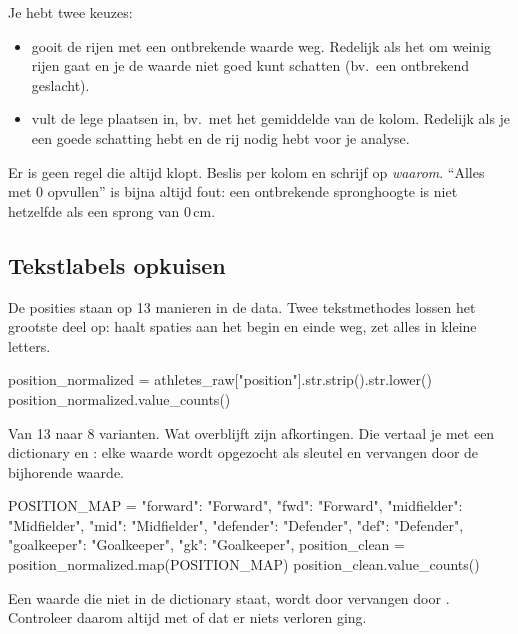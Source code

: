 \documentclass[11pt,a4paper]{article}
\begin{document}
Je hebt twee keuzes:

\begin{itemize}
  \item {} gooit de rijen met een ontbrekende waarde weg.
        Redelijk als het om weinig rijen gaat en je de waarde niet goed
        kunt schatten (bv.\ een ontbrekend geslacht).
  \item {} vult de lege plaatsen in, bv.\ met het
        gemiddelde van de kolom. Redelijk als je een goede schatting hebt
        en de rij nodig hebt voor je analyse.
\end{itemize}

\begin{kernidee}
Er is geen regel die altijd klopt. Beslis per kolom en schrijf op
\emph{waarom}. ``Alles met 0 opvullen'' is bijna altijd fout: een
ontbrekende spronghoogte is niet hetzelfde als een sprong van 0\,cm.
\end{kernidee}

\subsection{Tekstlabels opkuisen}

De posities staan op 13 manieren in de data. Twee tekstmethodes lossen
het grootste deel op:  haalt spaties aan het begin en
einde weg,  zet alles in kleine letters.

\begin{python}
position_normalized = athletes_raw["position"].str.strip().str.lower()
position_normalized.value_counts()
\end{python}

Van 13 naar 8 varianten. Wat overblijft zijn afkortingen. Die vertaal je
met een dictionary en : elke waarde wordt opgezocht als
sleutel en vervangen door de bijhorende waarde.

\begin{python}
POSITION_MAP = {
    "forward": "Forward", "fwd": "Forward",
    "midfielder": "Midfielder", "mid": "Midfielder",
    "defender": "Defender", "def": "Defender",
    "goalkeeper": "Goalkeeper", "gk": "Goalkeeper",
}
position_clean = position_normalized.map(POSITION_MAP)
position_clean.value_counts()
\end{python}

\begin{opgelet}
Een waarde die niet in de dictionary staat, wordt door 
vervangen door . Controleer daarom altijd met
 of  dat er niets verloren
ging.
\end{opgelet}
\end{document}
